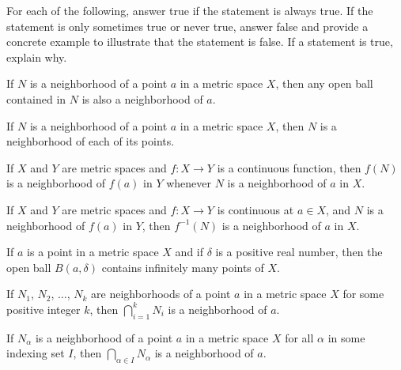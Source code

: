 \item For each of the following, answer true if the statement is always true. If the statement is only sometimes true or never true, answer false and provide a concrete example to illustrate that the statement is false. If a statement is true, explain why. 

	\ba
	\item If $N$ is a neighborhood of a point $a$ in a metric space $X$, then any open ball contained in $N$ is also a neighborhood of $a$. 

	\item If $N$ is a neighborhood of a point $a$ in a metric space $X$, then $N$ is a neighborhood of each of its points. 	
		
	\item If $X$ and $Y$ are metric spaces and $f : X \to Y$ is a continuous function, then $f(N)$ is a neighborhood of $f(a)$ in $Y$ whenever $N$ is a neighborhood of $a$ in $X$. 
	
	\item If $X$ and $Y$ are metric spaces and $f : X \to Y$ is continuous at $a \in X$, and $N$ is a neighborhood of $f(a)$ in $Y$, then $f^{-1}(N)$ is a neighborhood of $a$ in $X$.
	
	\item If $a$ is a point in a metric space $X$ and if $\delta$ is a positive real number, then the open ball $B(a,\delta)$ contains infinitely many points of $X$.

	\item If $N_1$, $N_2$, $\ldots$, $N_k$ are neighborhoods of a point $a$ in a metric space $X$ for some positive integer $k$, then $\bigcap_{i=1}^k N_i$ is a neighborhood of $a$.  
	
	\item If $N_{\alpha}$ is a neighborhood of a point $a$ in a metric space $X$ for all $\alpha$ in some indexing set $I$, then $\bigcap_{\alpha \in I} N_{\alpha}$ is a neighborhood of $a$.  
	
	\ea


